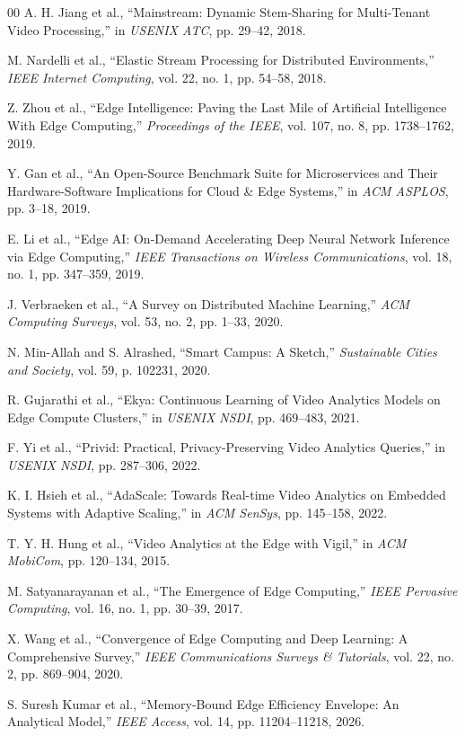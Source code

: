 \documentclass[conference]{IEEEtran}
\begin{document}
\begin{thebibliography}{00}
 A. H. Jiang et al., ``Mainstream: Dynamic Stem-Sharing for Multi-Tenant Video Processing,'' in \textit{USENIX ATC}, pp. 29--42, 2018.

 M. Nardelli et al., ``Elastic Stream Processing for Distributed Environments,'' \textit{IEEE Internet Computing}, vol. 22, no. 1, pp. 54--58, 2018.

 Z. Zhou et al., ``Edge Intelligence: Paving the Last Mile of Artificial Intelligence With Edge Computing,'' \textit{Proceedings of the IEEE}, vol. 107, no. 8, pp. 1738--1762, 2019.

 Y. Gan et al., ``An Open-Source Benchmark Suite for Microservices and Their Hardware-Software Implications for Cloud \& Edge Systems,'' in \textit{ACM ASPLOS}, pp. 3--18, 2019.

 E. Li et al., ``Edge AI: On-Demand Accelerating Deep Neural Network Inference via Edge Computing,'' \textit{IEEE Transactions on Wireless Communications}, vol. 18, no. 1, pp. 347--359, 2019.

 J. Verbraeken et al., ``A Survey on Distributed Machine Learning,'' \textit{ACM Computing Surveys}, vol. 53, no. 2, pp. 1--33, 2020.

 N. Min-Allah and S. Alrashed, ``Smart Campus: A Sketch,'' \textit{Sustainable Cities and Society}, vol. 59, p. 102231, 2020.

 R. Gujarathi et al., ``Ekya: Continuous Learning of Video Analytics Models on Edge Compute Clusters,'' in \textit{USENIX NSDI}, pp. 469--483, 2021.

 F. Yi et al., ``Privid: Practical, Privacy-Preserving Video Analytics Queries,'' in \textit{USENIX NSDI}, pp. 287--306, 2022.

 K. I. Hsieh et al., ``AdaScale: Towards Real-time Video Analytics on Embedded Systems with Adaptive Scaling,'' in \textit{ACM SenSys}, pp. 145--158, 2022.

 T. Y. H. Hung et al., ``Video Analytics at the Edge with Vigil,'' in \textit{ACM MobiCom}, pp. 120--134, 2015.

 M. Satyanarayanan et al., ``The Emergence of Edge Computing,'' \textit{IEEE Pervasive Computing}, vol. 16, no. 1, pp. 30--39, 2017.

 X. Wang et al., ``Convergence of Edge Computing and Deep Learning: A Comprehensive Survey,'' \textit{IEEE Communications Surveys \& Tutorials}, vol. 22, no. 2, pp. 869--904, 2020.

 S. Suresh Kumar et al., ``Memory-Bound Edge Efficiency Envelope: An Analytical Model,'' \textit{IEEE Access}, vol. 14, pp. 11204--11218, 2026.

\end{thebibliography}
\end{document}
